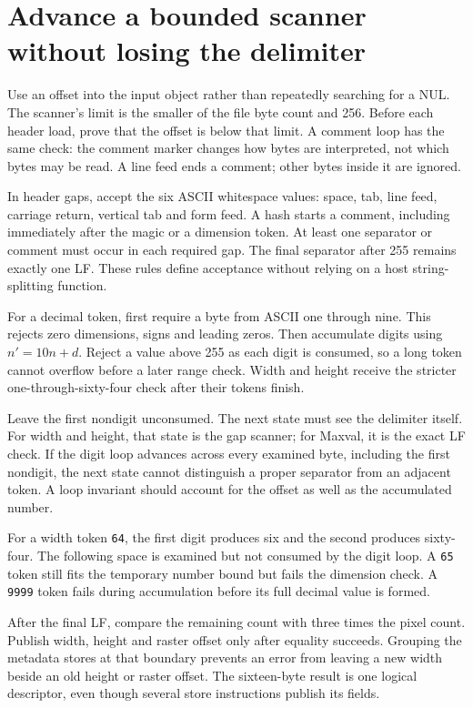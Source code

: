 \section{Advance a bounded scanner without losing the delimiter}
Use an offset into the input object rather than repeatedly searching for a NUL. The
scanner's limit is the smaller of the file byte count and 256. Before each header load,
prove that the offset is below that limit. A comment loop has the same check: the
comment marker changes how bytes are interpreted, not which bytes may be read. A line
feed ends a comment; other bytes inside it are ignored.

In header gaps, accept the six ASCII whitespace values: space, tab, line feed, carriage
return, vertical tab and form feed. A hash starts a comment, including immediately after
the magic or a dimension token. At least one separator or comment must occur in each
required gap. The final separator after 255 remains exactly one LF. These rules define
acceptance without relying on a host string-splitting function.

For a decimal token, first require a byte from ASCII one through nine. This rejects
zero dimensions, signs and leading zeros. Then accumulate digits using \(n'=10n+d\).
Reject a value above 255 as each digit is consumed, so a long token cannot overflow
before a later range check. Width and height receive the stricter one-through-sixty-four
check after their tokens finish.

Leave the first nondigit unconsumed. The next state must see the delimiter itself.
For width and height, that state is the gap scanner; for Maxval, it is the exact LF
check. If the digit loop advances across every examined byte, including the first
nondigit, the next state cannot distinguish a proper separator from an adjacent token.
A loop invariant should account for the offset as well as the accumulated number.

For a width token \texttt{64}, the first digit produces six and the second produces
sixty-four. The following space is examined but not consumed by the digit loop. A
\texttt{65} token still fits the temporary number bound but fails the dimension check.
A \texttt{9999} token fails during accumulation before its full decimal value is formed.

After the final LF, compare the remaining count with three times the pixel count.
Publish width, height and raster offset only after equality succeeds. Grouping the
metadata stores at that boundary prevents an error from leaving a new width beside
an old height or raster offset. The sixteen-byte result is one logical descriptor,
even though several store instructions publish its fields.
